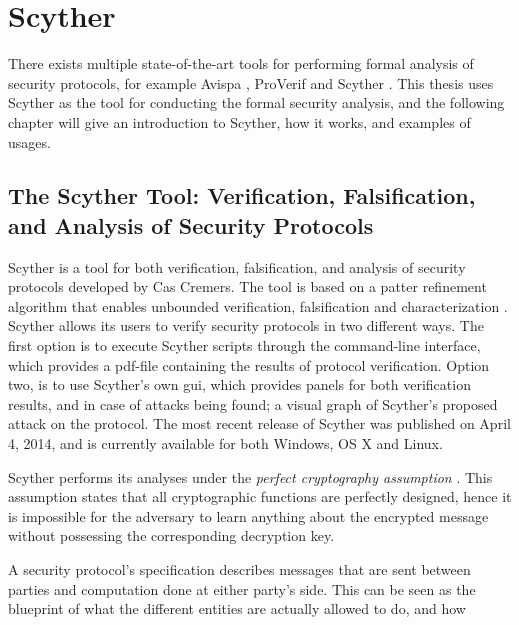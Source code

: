 \chapter{Scyther}
\label{chp:scyther} 


There exists multiple state-of-the-art tools for performing formal analysis of security protocols, for example Avispa \cite{avispa}, ProVerif \cite{proverif} and Scyther \cite{scyther}. This thesis uses Scyther as the tool for conducting the formal security analysis, and the following chapter will give an introduction to Scyther, how it works, and examples of usages.


\section{The Scyther Tool: Verification, Falsification, and Analysis of Security Protocols}

Scyther is a tool for both verification, falsification, and analysis of security protocols developed by Cas Cremers. The tool is based on a patter refinement algorithm that enables unbounded verification, falsification and characterization \cite{cremers2008scyther}. Scyther allows its users to verify security protocols in two different ways. The first option is to execute Scyther scripts through the command-line interface, which provides a pdf-file containing the results of protocol verification. Option two, is to use Scyther's own \gls{gui}, which provides panels for both verification results, and in case of attacks being found; a visual graph of Scyther's proposed attack on the protocol. The most recent release of Scyther was published on April 4, 2014, and is currently available for both Windows, OS X and Linux.


Scyther performs its analyses under the \emph{perfect cryptography assumption} \cite{cremers2008unbounded}. This assumption states that all cryptographic functions are perfectly designed, hence it is impossible for the adversary to learn anything about the encrypted message without possessing the corresponding decryption key.


A security protocol's specification describes messages that are sent between parties and computation done at either party's side. This can be seen as the blueprint of what the different entities are actually allowed to do, and how  


